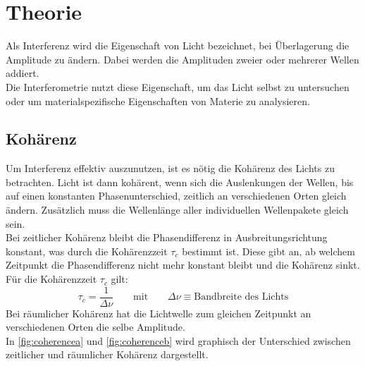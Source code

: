 \section{Theorie}
\label{sec:theorie}

Als Interferenz wird die Eigenschaft von Licht bezeichnet, bei Überlagerung die Amplitude zu ändern.
Dabei werden die Amplituden zweier oder mehrerer Wellen addiert.\\
Die Interferometrie nutzt diese Eigenschaft, um das Licht selbst zu untersuchen oder um materialspezifische Eigenschaften von Materie zu analysieren.

\subsection{Kohärenz}
Um Interferenz effektiv auszunutzen, ist es nötig die Kohärenz des Lichts zu betrachten.
Licht ist dann kohärent, wenn sich die Auslenkungen der Wellen, bis auf einen konstanten Phasenunterschied, zeitlich an verschiedenen Orten gleich ändern.
Zusätzlich muss die Wellenlänge aller individuellen Wellenpakete gleich sein.\\
\newline
Bei zeitlicher Kohärenz bleibt die Phasendifferenz in Ausbreitungsrichtung konstant, was durch die Kohärenzzeit $\tau_c$ bestimmt ist.
Diese gibt an, ab welchem Zeitpunkt die Phasendifferenz nicht mehr konstant bleibt und die Kohärenz sinkt.
Für die Kohärenzzeit $\tau_c$ gilt:
\begin{equation}
    \tau_c = \frac{1}{\Delta \nu} \qquad \text{mit} \qquad \Delta \nu \equiv \text{Bandbreite des Lichts}
\end{equation}
\newline
Bei räumlicher Kohärenz hat die Lichtwelle zum gleichen Zeitpunkt an verschiedenen Orten die selbe Amplitude.\\
In \autoref{fig:coherencea} und \ref{fig:coherenceb} wird graphisch der Unterschied zwischen zeitlicher und räumlicher Kohärenz dargestellt.

